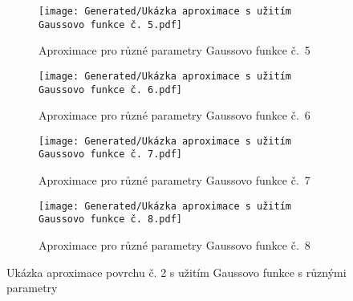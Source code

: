 \begin{landscapeimagepage}
    \begin{figure}[H]
        \centering
        \begin{subfigure}{.5\textheight}
            \centering
            \texttt{[image: Generated/Ukázka aproximace s užitím Gaussovo funkce č. 5.pdf]}
            \caption{Aproximace pro různé parametry Gaussovo funkce č.~5}
            \label{fig:Ukázka aproximace povrchu s užitím Gaussovo funkce č. 5}
        \end{subfigure}
        \vspace{0.5cm}
        \hspace{2.5cm}
        \begin{subfigure}{.5\textheight}
            \centering
            \texttt{[image: Generated/Ukázka aproximace s užitím Gaussovo funkce č. 6.pdf]}
            \caption{Aproximace pro různé parametry Gaussovo funkce č.~6}
            \label{fig:Ukázka aproximace povrchu s užitím Gaussovo funkce č. 6}
        \end{subfigure}
        \vspace{0.5cm}
        \begin{subfigure}{.5\textheight}
            \centering
            \texttt{[image: Generated/Ukázka aproximace s užitím Gaussovo funkce č. 7.pdf]}
            \caption{Aproximace pro různé parametry Gaussovo funkce č.~7}
            \label{fig:Ukázka aproximace povrchu s užitím Gaussovo funkce č. 7}
        \end{subfigure}
        \hspace{2.5cm}
        \begin{subfigure}{.5\textheight}
            \centering
            \texttt{[image: Generated/Ukázka aproximace s užitím Gaussovo funkce č. 8.pdf]}
            \caption{Aproximace pro různé parametry Gaussovo funkce č.~8}
            \label{fig:Ukázka aproximace povrchu s užitím Gaussovo funkce č. 8}
        \end{subfigure}
        \caption{Ukázka aproximace povrchu č. 2 s užitím Gaussovo funkce s různými parametry}
        \label{fig:Ukázka aproximace povrchu č. 2 s užitím Gaussovo funkce s různými parametry}
    \end{figure}
\end{landscapeimagepage}